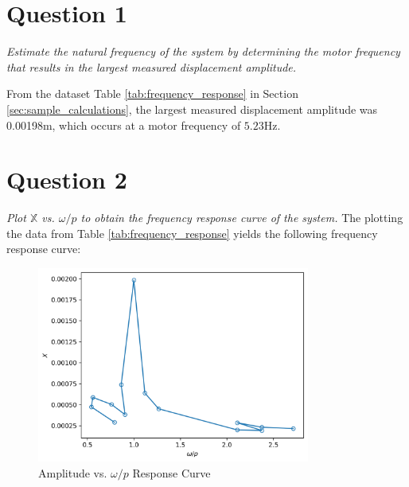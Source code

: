 \section{Question 1}
\textit{Estimate the natural frequency of the system by determining the motor frequency that results in the largest measured displacement amplitude.}

From the dataset Table \ref{tab:frequency_response} in Section \ref{sec:sample_calculations}, the largest measured displacement amplitude was 0.00198m, which occurs at a motor frequency of $\boxed{5.23 \text{Hz}}$.

\section{Question 2}
\textit{Plot $\mathbb{X}$ vs. $\omega/p$ to obtain the frequency response curve of the system.}
The plotting the data from Table \ref{tab:frequency_response} yields the following frequency response curve:
\begin{figure}[H]
    \centering
    \includegraphics[width=0.8\textwidth]{Questions/Plots/X_vs_omega_p.png}
    \caption{Amplitude vs. $\omega/p$ Response Curve}
    \label{fig:frequency_response_curve}
\end{figure}

